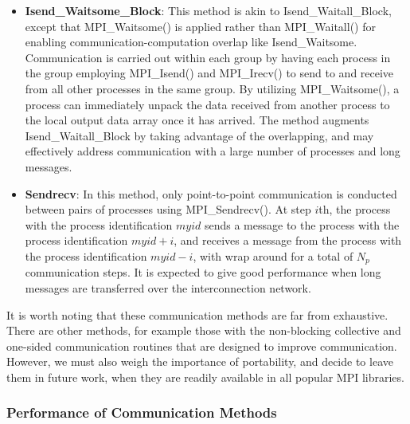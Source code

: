 \begin{itemize}
\item
\textbf{Isend\_Waitsome\_Block}: This method is akin to Isend\_Waitall\_Block, except that MPI\_Waitsome() is applied rather than MPI\_Waitall() for enabling communication-computation overlap like Isend\_Waitsome. Communication is carried out within each group by having each process in the group employing MPI\_Isend() and MPI\_Irecv() to send to and receive from all other processes in the same group. By utilizing MPI\_Waitsome(), a process can immediately unpack the data received from another process to the local output data array once it has arrived. The method augments Isend\_Waitall\_Block by taking advantage of the overlapping, and may effectively address communication with a large number of processes and long messages. 
\item
\textbf{Sendrecv}: In this method, only point-to-point communication is conducted between pairs of processes using MPI\_Sendrecv(). At step $i$th, the process with the process identification $myid$ sends a message to the process with the process identification $myid+i$, and receives
a message from the process with the process identification $myid-i$, with wrap around for a total of $N_p$ communication steps. It is expected to give good performance when long messages are transferred over the interconnection network.  
\end{itemize}

It is worth noting that these communication methods are far from exhaustive. There are other methods, for example those with the non-blocking collective and one-sided communication routines that are designed to improve communication. However, we must also weigh the importance of portability, and decide to leave them in future work, when they are readily available in all popular MPI libraries.   

\subsubsection{Performance of Communication Methods}
\label{sec-per-comm}

